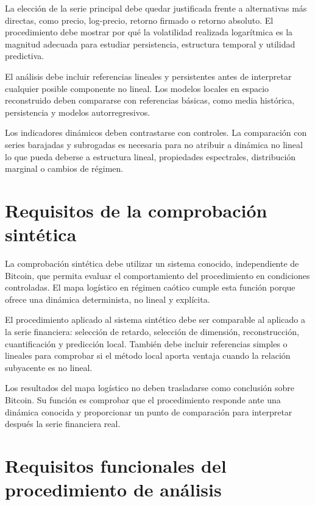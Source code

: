 La elección de la serie principal debe quedar justificada frente a alternativas más directas, como precio, log-precio, retorno firmado o retorno absoluto. El procedimiento debe mostrar por qué la volatilidad realizada logarítmica es la magnitud adecuada para estudiar persistencia, estructura temporal y utilidad predictiva.

El análisis debe incluir referencias lineales y persistentes antes de interpretar cualquier posible componente no lineal. Los modelos locales en espacio reconstruido deben compararse con referencias básicas, como media histórica, persistencia y modelos autorregresivos.

Los indicadores dinámicos deben contrastarse con controles. La comparación con series barajadas y subrogadas es necesaria para no atribuir a dinámica no lineal lo que pueda deberse a estructura lineal, propiedades espectrales, distribución marginal o cambios de régimen.

\section{Requisitos de la comprobación sintética}\label{sec:requisitos-comprobacion-sintetica}

La comprobación sintética debe utilizar un sistema conocido, independiente de Bitcoin, que permita evaluar el comportamiento del procedimiento en condiciones controladas. El mapa logístico en régimen caótico cumple esta función porque ofrece una dinámica determinista, no lineal y explícita.

El procedimiento aplicado al sistema sintético debe ser comparable al aplicado a la serie financiera: selección de retardo, selección de dimensión, reconstrucción, cuantificación y predicción local. También debe incluir referencias simples o lineales para comprobar si el método local aporta ventaja cuando la relación subyacente es no lineal.

Los resultados del mapa logístico no deben trasladarse como conclusión sobre Bitcoin. Su función es comprobar que el procedimiento responde ante una dinámica conocida y proporcionar un punto de comparación para interpretar después la serie financiera real.

\section{Requisitos funcionales del procedimiento de análisis}\label{sec:requisitos-procedimiento}

